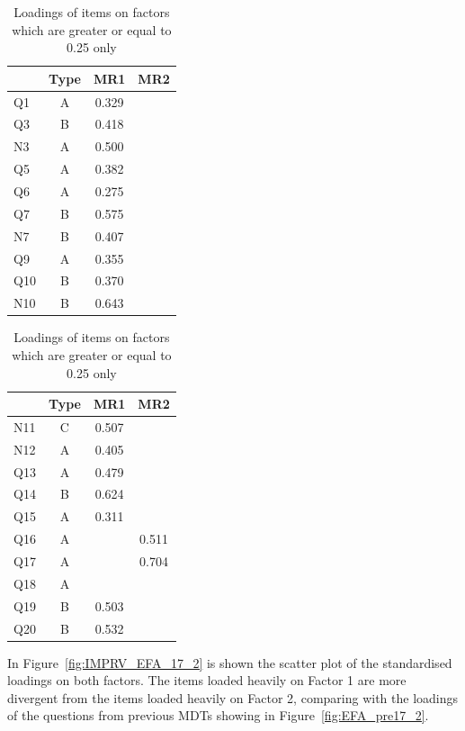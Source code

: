 \documentclass[a4paper]{report}
\begin{document}
\begin{table}[ht]
  \begin{minipage}{0.5\linewidth}
    \centering
    \begin{tabular}{lccc}
      \hline
     & Type & MR1 & MR2 \\ 
      \hline
    Q1 & A & 0.329 &  \\ 
      Q3 & B & 0.418 &  \\ 
      N3 & A & 0.500 &  \\ 
      Q5 & A & 0.382 &  \\ 
      Q6 & A & 0.275 &  \\ 
      Q7 & B & 0.575 &  \\ 
      N7 & B & 0.407 &  \\ 
      Q9 & A & 0.355 &  \\ 
      Q10 & B & 0.370 &  \\ 
      N10 & B & 0.643 &  \\ 
       \hline
    \end{tabular}
  \end{minipage}%
  \begin{minipage}{0.5\linewidth}
    \centering
    \begin{tabular}{lccc}
      \hline
     & Type & MR1 & MR2 \\ 
      \hline
    N11 & C & 0.507 &  \\ 
      N12 & A & 0.405 &  \\ 
      Q13 & A & 0.479 &  \\ 
      Q14 & B & 0.624 &  \\ 
      Q15 & A & 0.311 &  \\ 
      Q16 & A &  & 0.511 \\ 
      Q17 & A &  & 0.704 \\ 
      Q18 & A &  &  \\ 
      Q19 & B & 0.503 &  \\ 
      Q20 & B & 0.532 &  \\ 
       \hline
    \end{tabular}
  \end{minipage}
  \caption{\label{tab:IMPRV_EFA_17_2}Loadings of items on factors which are greater or equal to 0.25 only}
\end{table}

In Figure~\ref{fig:IMPRV_EFA_17_2} is shown the scatter plot of the standardised loadings on both factors. The items loaded heavily on Factor 1 are more divergent from the items loaded heavily on Factor 2, comparing with the loadings of the questions from previous MDTs showing in Figure~\ref{fig:EFA_pre17_2}. 
\end{document}
